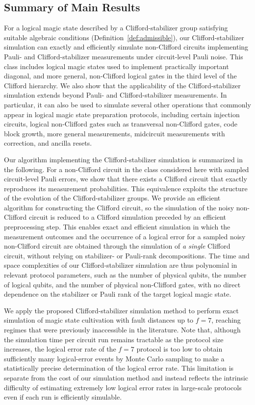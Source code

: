 \documentclass[
 reprint,
 amsmath,amssymb,
 pra,superscriptaddress, nofootinbib
]{revtex4-2}
\theoremstyle{definition}
\theoremstyle{plain}
\begin{document}
\subsection{Summary of Main Results}
For a logical magic state described by a Clifford-stabilizer group satisfying suitable algebraic conditions (Definition~\ref{def:admissible}), our Clifford-stabilizer simulation can exactly and efficiently simulate non-Clifford circuits implementing Pauli- and Clifford-stabilizer measurements under circuit-level Pauli noise.
This class includes logical magic states used to implement practically important diagonal, and more general, non-Clifford logical gates in the third level of the Clifford hierarchy. 
We also show that the applicability of the Clifford-stabilizer simulation extends beyond Pauli- and Clifford-stabilizer measurements. In particular, it can also be used to simulate several other operations that commonly appear in logical magic state preparation protocols, including certain injection circuits, logical non-Clifford gates such as transversal non-Clifford gates, code block growth, more general measurements, midcircuit measurements with correction, and ancilla resets.

Our algorithm implementing the Clifford-stabilizer simulation is summarized in the following. For a non-Clifford circuit in the class considered here with sampled circuit-level Pauli errors, we show that there exists a Clifford circuit that exactly reproduces its measurement probabilities.
This equivalence exploits the structure of the evolution of the Clifford-stabilizer groups.
We provide an efficient algorithm for constructing the Clifford circuit, so the simulation of the noisy non-Clifford circuit is reduced to a Clifford simulation preceded by an efficient preprocessing step.
This enables exact and efficient simulation in which the measurement outcomes and the occurrence of a logical error for a sampled noisy non-Clifford circuit are obtained through the simulation of \emph{a single} Clifford circuit, without relying on stabilizer- or Pauli-rank decompositions.
The time and space complexities of our Clifford-stabilizer simulation are thus polynomial in relevant protocol parameters, such as the number of physical qubits, the number of logical qubits, and the number of physical non-Clifford gates, with no direct dependence on the stabilizer or Pauli rank of the target logical magic state.
    
We apply the proposed Clifford-stabilizer simulation method to perform exact simulation of magic state cultivation with fault distances up to $f=7$, reaching regimes that were previously inaccessible in the literature. Note that, although the simulation time per circuit run remains tractable as the protocol size increases, the logical error rate of the $f=7$ protocol is too low to obtain sufficiently many logical-error events by Monte Carlo sampling to make a statistically precise determination of the logical error rate. This limitation is separate from the cost of our simulation method and instead reflects the intrinsic difficulty of estimating extremely low logical error rates in large-scale protocols even if each run is efficiently simulable.
\end{document}
